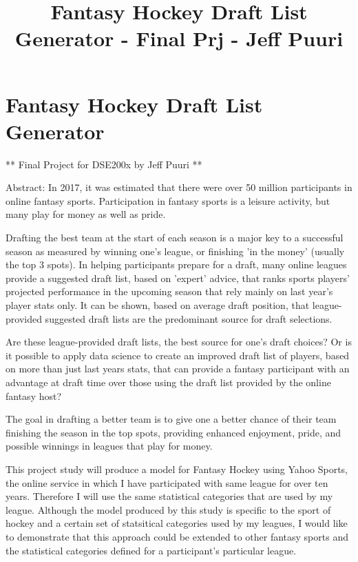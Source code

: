 \documentclass[11pt]{article}
\title{Fantasy Hockey Draft List Generator - Final Prj - Jeff Puuri}
\begin{document}
    
    
    \maketitle
    
    

    
    \section{Fantasy Hockey Draft List
Generator}\label{fantasy-hockey-draft-list-generator}

** Final Project for DSE200x by Jeff Puuri **

Abstract: In 2017, it was estimated that there were over 50 million
participants in online fantasy sports. Participation in fantasy sports
is a leisure activity, but many play for money as well as pride.

Drafting the best team at the start of each season is a major key to a
successful season as measured by winning one's league, or finishing 'in
the money' (usually the top 3 spots). In helping participants prepare
for a draft, many online leagues provide a suggested draft list, based
on 'expert' advice, that ranks sports players' projected performance in
the upcoming season that rely mainly on last year's player stats only.
It can be shown, based on average draft position, that league-provided
suggested draft lists are the predominant source for draft selections.

Are these league-provided draft lists, the best source for one's draft
choices? Or is it possible to apply data science to create an improved
draft list of players, based on more than just last years stats, that
can provide a fantasy participant with an advantage at draft time over
those using the draft list provided by the online fantasy host?

The goal in drafting a better team is to give one a better chance of
their team finishing the season in the top spots, providing enhanced
enjoyment, pride, and possible winnings in leagues that play for money.

This project study will produce a model for Fantasy Hockey using Yahoo
Sports, the online service in which I have participated with same league
for over ten years. Therefore I will use the same statistical categories
that are used by my league. Although the model produced by this study is
specific to the sport of hockey and a certain set of statsitical
categories used by my leagues, I would like to demonstrate that this
approach could be extended to other fantasy sports and the statistical
categories defined for a participant's particular league.
\end{document}
